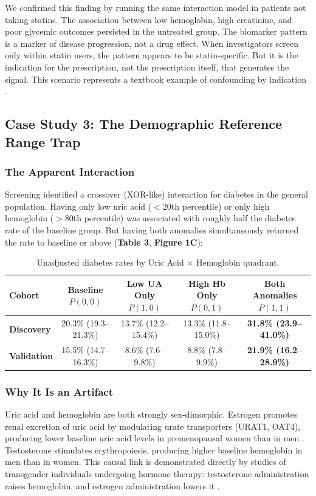 \documentclass[10pt,letterpaper]{article}
\begin{document}
We confirmed this finding by running the same interaction model in patients not taking statins. The association between low hemoglobin, high creatinine, and poor glycemic outcomes persisted in the untreated group. The biomarker pattern is a marker of disease progression, not a drug effect. When investigators screen only within statin users, the pattern appears to be statin-specific. But it is the indication for the prescription, not the prescription itself, that generates the signal. This scenario represents a textbook example of confounding by indication \cite{hernan2006}.

\subsection{Case Study 3: The Demographic Reference Range Trap}

\subsubsection{The Apparent Interaction}
Screening identified a crossover (XOR-like) interaction for diabetes in the general population. Having only low uric acid ($<20$th percentile) or only high hemoglobin ($>80$th percentile) was associated with roughly half the diabetes rate of the baseline group. But having both anomalies simultaneously returned the rate to baseline or above (\textbf{Table 3}, \textbf{Figure 1C}):

\begin{table}[htbp]
\centering
\small
\begin{threeparttable}
\caption{Unadjusted diabetes rates by Uric Acid $\times$ Hemoglobin quadrant.}
\begin{tabular*}{\linewidth}{@{\extracolsep{\fill}}lcccc@{}}
\toprule
\textbf{Cohort} & \textbf{Baseline} $P(0,0)$ & \textbf{Low UA Only} $P(1,0)$ & \textbf{High Hb Only} $P(0,1)$ & \textbf{Both Anomalies} $P(1,1)$ \\
\midrule
\textbf{Discovery} & 20.3\% (19.3--21.3\%) & 13.7\% (12.2--15.4\%) & 13.3\% (11.8--15.0\%) & \textbf{31.8\% (23.9--41.0\%)} \\
\textbf{Validation} & 15.5\% (14.7--16.3\%) & 8.6\% (7.6--9.8\%) & 8.8\% (7.8--9.9\%) & \textbf{21.9\% (16.2--28.9\%)} \\
\bottomrule
\end{tabular*}
\end{threeparttable}
\end{table}

\subsubsection{Why It Is an Artifact}
Uric acid and hemoglobin are both strongly sex-dimorphic. Estrogen promotes renal excretion of uric acid by modulating urate transporters (URAT1, OAT4), producing lower baseline uric acid levels in premenopausal women than in men \cite{hak2008, sumino1999}. Testosterone stimulates erythropoiesis, producing higher baseline hemoglobin in men than in women. This causal link is demonstrated directly by studies of transgender individuals undergoing hormone therapy: testosterone administration raises hemoglobin, and estrogen administration lowers it \cite{antun2020}.
\end{document}

